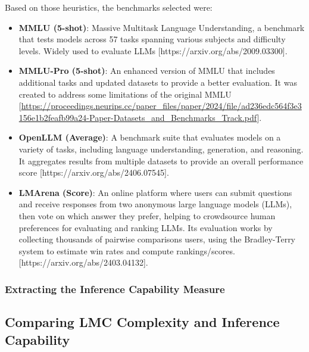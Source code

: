         Based on those heuristics, the benchmarks selected were:
        \begin{itemize}
            \item \textbf{MMLU (5-shot)}: Massive Multitask Language Understanding, a benchmark that tests models across 57 tasks spanning various subjects and difficulty levels. Widely used to evaluate LLMs [https://arxiv.org/abs/2009.03300].

            \item \textbf{MMLU-Pro (5-shot)}: An enhanced version of MMLU that includes additional tasks and updated datasets to provide a better evaluation. It was created to address some limitations of the original MMLU [\url{https://proceedings.neurips.cc/paper_files/paper/2024/file/ad236edc564f3e3156e1b2feafb99a24-Paper-Datasets_and_Benchmarks_Track.pdf}].
            
            \item \textbf{OpenLLM (Average)}: A benchmark suite that evaluates models on a variety of tasks, including language understanding, generation, and reasoning. It aggregates results from multiple datasets to provide an overall performance score [https://arxiv.org/abs/2406.07545].
            
            \item \textbf{LMArena (Score)}: An online platform where users can submit questions and receive responses from two anonymous large language models (LLMs), then vote on which answer they prefer, helping to crowdsource human preferences for evaluating and ranking LLMs. Its evaluation works by collecting thousands of pairwise comparisons users, using  the Bradley-Terry system to estimate win rates and compute rankings/scores. [https://arxiv.org/abs/2403.04132].
        \end{itemize}

    \subsubsection{Extracting the Inference Capability Measure}

\subsection{Comparing LMC Complexity and Inference Capability}


